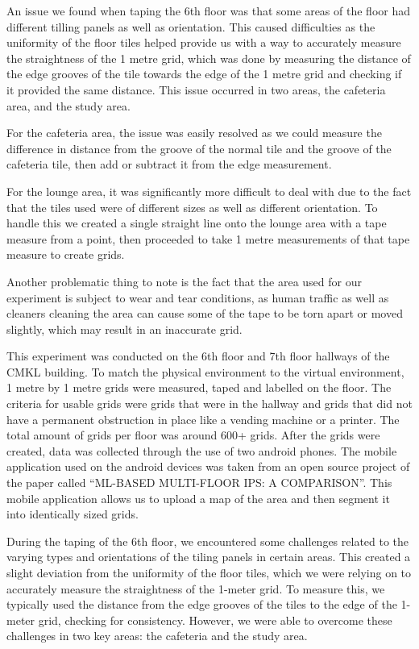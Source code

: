 \documentclass[conference]{IEEEtran}
\begin{document}
	An issue we found when taping the 6th floor was that some areas of the floor had different tilling panels as well as orientation. This caused difficulties as the uniformity of the floor tiles helped provide us with a way to accurately measure the straightness of the 1 metre grid, which was done by measuring the distance of the edge grooves of the tile towards the edge of the 1 metre grid and checking if it provided the same distance. This issue occurred in two areas, the cafeteria area, and the study area.
	
	For the cafeteria area, the issue was easily resolved as we could measure the difference in distance from the groove of the normal tile and the groove of the cafeteria tile, then add or subtract it from the edge measurement. 
	
	
	For the lounge area, it was significantly more difficult to deal with due to the fact that the tiles used were of different sizes as well as different orientation. To handle this we created a single straight line onto the lounge area with a tape measure from a point, then proceeded to take 1 metre measurements of that tape measure to create grids. 
	
	Another problematic thing to note is the fact that the area used for our experiment is subject to wear and tear conditions, as human traffic as well as cleaners cleaning the area can cause some of the tape to be torn apart or moved slightly, which may result in an inaccurate grid.  
	
	This experiment was conducted on the 6th floor and 7th floor hallways of the CMKL building. To match the physical environment to the virtual environment, 1 metre by 1 metre grids were measured, taped and labelled on the floor. The criteria for usable grids were grids that were in the hallway and grids that did not have a permanent obstruction in place like a vending machine or a printer. The total amount of grids per floor was around 600+ grids. After the grids were created, data was collected through the use of two android phones. The mobile application used on the android devices was taken from an open source project of the paper called “ML-BASED MULTI-FLOOR IPS: A COMPARISON”\cite{bgp4}. This mobile application allows us to upload a map of the area and then segment it into identically sized grids.
	
	
	During the taping of the 6th floor, we encountered some challenges related to the varying types and orientations of the tiling panels in certain areas. This created a slight deviation from the uniformity of the floor tiles, which we were relying on to accurately measure the straightness of the 1-meter grid. To measure this, we typically used the distance from the edge grooves of the tiles to the edge of the 1-meter grid, checking for consistency. However, we were able to overcome these challenges in two key areas: the cafeteria and the study area.
	
\end{document}
